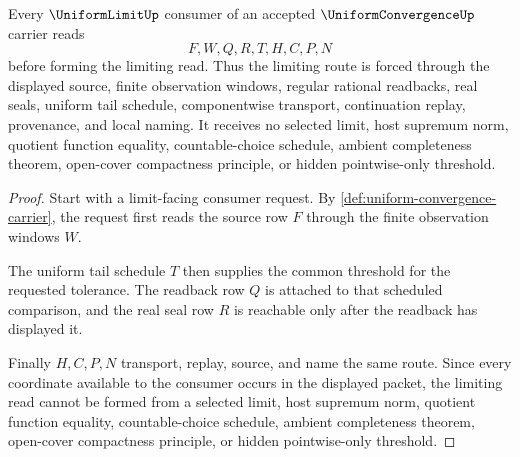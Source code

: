 \begin{theorem}
\label{thm:uniform-convergence-uniform-limit-handoff}
Every $\UniformLimitUp$ consumer of an accepted $\UniformConvergenceUp$ carrier reads
$$
F,W,Q,R,T,H,C,P,N
$$
before forming the limiting read. Thus the limiting route is forced through the displayed source, finite observation windows, regular rational readbacks, real seals, uniform tail schedule, componentwise transport, continuation replay, provenance, and local naming. It receives no selected limit, host supremum norm, quotient function equality, countable-choice schedule, ambient completeness theorem, open-cover compactness principle, or hidden pointwise-only threshold.
\end{theorem}

\begin{proof}
Start with a limit-facing consumer request. By \autoref{def:uniform-convergence-carrier}, the request first reads the source row $F$ through the finite observation windows $W$.

The uniform tail schedule $T$ then supplies the common threshold for the requested tolerance. The readback row $Q$ is attached to that scheduled comparison, and the real seal row $R$ is reachable only after the readback has displayed it.

Finally $H,C,P,N$ transport, replay, source, and name the same route. Since every coordinate available to the consumer occurs in the displayed packet, the limiting read cannot be formed from a selected limit, host supremum norm, quotient function equality, countable-choice schedule, ambient completeness theorem, open-cover compactness principle, or hidden pointwise-only threshold.
\end{proof}




